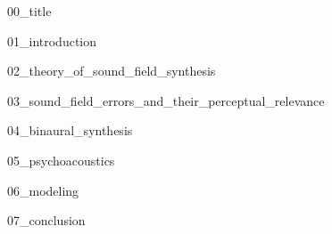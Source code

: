 \documentclass[a4paper, oneside, nobib, notoc, justified]{tufte-book}%
\def \PATH {.}                                                    %
\begin{document}
{00_title}

\tableofcontents

{01_introduction}

{02_theory_of_sound_field_synthesis}

{03_sound_field_errors_and_their_perceptual_relevance}

{04_binaural_synthesis}

{05_psychoacoustics}

{06_modeling}

{07_conclusion}


\printbibliography
\end{document}
